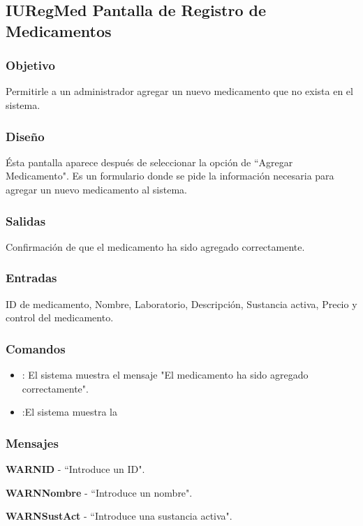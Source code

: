 \subsection{IURegMed Pantalla de Registro de Medicamentos}

\subsubsection{Objetivo}
	Permitirle a un administrador agregar un nuevo medicamento que no exista en el sistema.

\subsubsection{Diseño}
	\'Esta pantalla aparece despu\'es de seleccionar la opción de ``Agregar Medicamento". Es un formulario donde se pide la informaci\'on necesaria para agregar un nuevo medicamento al sistema.


\subsubsection{Salidas}

	Confirmación de que el medicamento ha sido agregado correctamente.

\subsubsection{Entradas}
	ID de medicamento, Nombre, Laboratorio, Descripción, Sustancia activa, Precio y control del medicamento.

\subsubsection{Comandos}
\begin{itemize}
		\item {} : El sistema muestra el mensaje "El medicamento ha sido agregado correctamente".
		\item {} :El sistema muestra la \label{IUAdmin}
\end{itemize}

\subsubsection{Mensajes}
	\begin{Citemize}
		\item {\bf WARNID} - ``Introduce un ID".
		\item {\bf WARNNombre} - ``Introduce un nombre".
		\item {\bf WARNSustAct} - ``Introduce una sustancia activa".
	\end{Citemize}